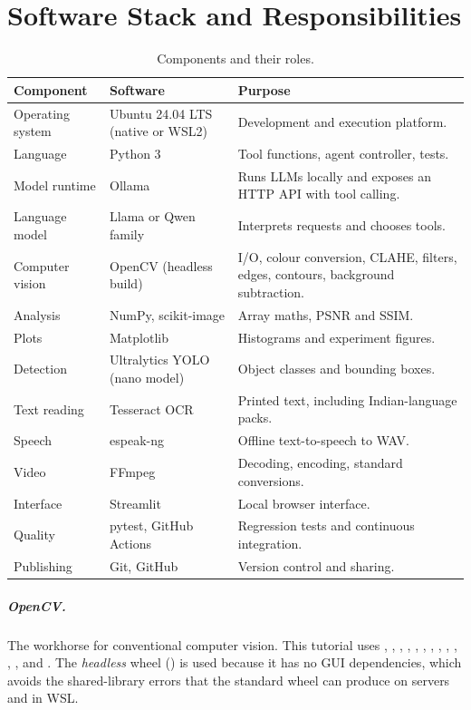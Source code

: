 \chapter{Software Stack and Responsibilities}
\begin{table}[ht]
\centering\small
\begin{tabular}{@{}p{3.1cm}p{3.6cm}p{8.2cm}@{}}
\toprule
\textbf{Component} & \textbf{Software} & \textbf{Purpose}\\
\midrule
Operating system & Ubuntu 24.04 LTS (native or WSL2) & Development and execution platform.\\
Language & Python 3 & Tool functions, agent controller, tests.\\
Model runtime & Ollama & Runs LLMs locally and exposes an HTTP API with tool calling.\\
Language model & Llama or Qwen family & Interprets requests and chooses tools.\\
Computer vision & OpenCV (headless build) & I/O, colour conversion, CLAHE, filters, edges, contours, background subtraction.\\
Analysis & NumPy, scikit-image & Array maths, PSNR and SSIM.\\
Plots & Matplotlib & Histograms and experiment figures.\\
Detection & Ultralytics YOLO (nano model) & Object classes and bounding boxes.\\
Text reading & Tesseract OCR & Printed text, including Indian-language packs.\\
Speech & espeak-ng & Offline text-to-speech to WAV.\\
Video & FFmpeg & Decoding, encoding, standard conversions.\\
Interface & Streamlit & Local browser interface.\\
Quality & pytest, GitHub Actions & Regression tests and continuous integration.\\
Publishing & Git, GitHub & Version control and sharing.\\
\bottomrule
\end{tabular}
\caption{Components and their roles.}
\end{table}

\paragraph{OpenCV.} The workhorse for conventional computer vision. This tutorial uses , ,
, , , , , ,
, , , ,  and
. The \emph{headless} wheel () is used because it has no GUI dependencies,
which avoids the shared-library errors that the standard wheel can produce on servers and in WSL.

